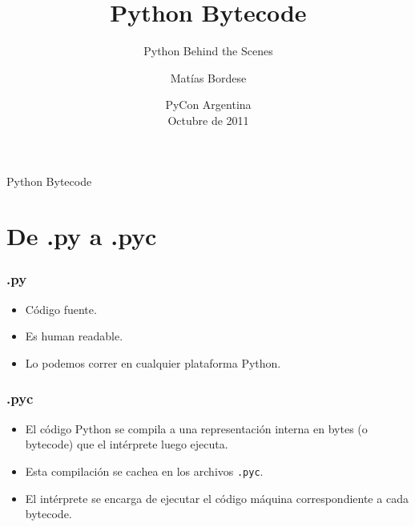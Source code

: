 \documentclass[9pt, notes=hide]{beamer}
\title{Python Bytecode}
\subtitle{Python Behind the Scenes}
\author{Matías Bordese}
\institute{}
\date{PyCon Argentina\\Octubre de 2011}
\begin{document}

\begin{frame}
    \titlepage
\end{frame}

\section*{}
    \begin{frame}{Python Bytecode}
        \tableofcontents
    \end{frame}


\section{De .py a .pyc}

    \begin{frame}
        \frametitle{.py}

        \begin{itemize}
            \item Código fuente.
            \item Es human readable.
            \item Lo podemos correr en cualquier plataforma Python.
        \end{itemize}
    \end{frame}

    \begin{frame}
        \frametitle{.pyc}

        \begin{itemize}
            \item El código Python se compila a una representación interna en bytes (o bytecode) que el intérprete luego ejecuta.
            \item Esta compilación se cachea en los archivos \texttt{.pyc}.
            \item El intérprete se encarga de ejecutar el código máquina correspondiente a cada bytecode.
        \end{itemize}
    \end{frame}
\end{document}
